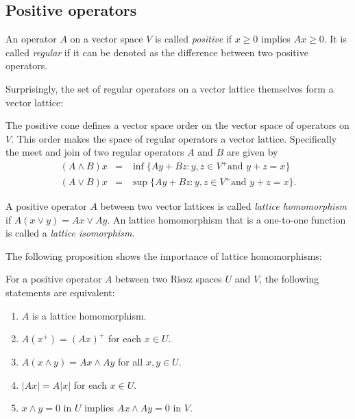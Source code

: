\documentclass[12pt]{report}
\begin{document}
\subsection{Positive operators}
                                                                                                                                                                         

\begin{defn}
An operator $A$ on a vector space $V$ is called \emph{positive} if $x \ge 0$ implies $Ax \ge 0$. It is called \emph{regular} if it can be denoted as the difference between two positive operators.
\end{defn}


Surprisingly, the set of regular operators on a vector lattice themselves form a vector lattice:
\begin{prop}
The positive cone defines a vector space order on the vector space of operators on $V$. This order makes the space of regular operators a vector lattice. Specifically the meet and join of two regular operators $A$ and $B$ are given by
\begin{eqnarray*}
(A \land B)x & = & \inf\{Ay + Bz : y,z \in V^+ \text{and } y + z = x\}\\
(A \lor B)x & = & \sup\{Ay + Bz : y,z \in V^+ \text{and } y + z = x\}.
\end{eqnarray*}
\end{prop}

\begin{defn}
A positive operator $A$ between two vector lattices is called \emph{lattice homomorphism} if $A(x \lor y) = Ax \lor Ay$. An lattice homomorphism that is a one-to-one function is called a \emph{lattice isomorphism}.
\end{defn}

The following proposition shows the importance of lattice homomorphisms:
\begin{prop}
For a positive operator $A$ between two Riesz spaces $U$ and $V$, the following statements are equivalent:
\begin{enumerate}[\indent(a).]
\item $A$ is a lattice homomorphism.
\item $A(x^+) = (Ax)^+$ for each $x \in U$.
\item $A(x \land y) = Ax \land Ay$ for all $x,y \in U$.
\item $|Ax| = A|x|$ for each $x \in U$.
\item $x\land y = 0$ in $U$ implies $Ax \land Ay = 0$ in $V$. 
\end{enumerate}
\end{prop}


 
 
 
 
\end{document}
